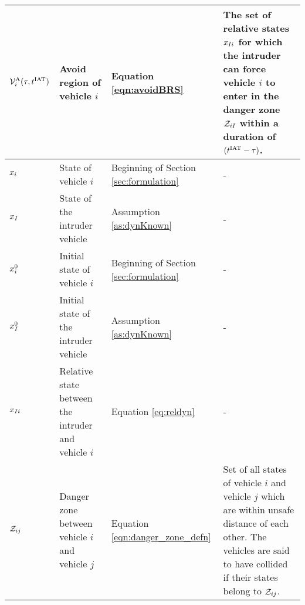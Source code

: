 \begin{table*}
{\begin{tabular}{ |>{\centering\arraybackslash}m{1.5cm}| m{5cm} | m{3cm} | m{\columnwidth} |}
    $\mathcal{V}^{\text{A}}_{i}(\tau, t^\text{IAT})$ & Avoid region of vehicle $i$ & Equation \eqref{eqn:avoidBRS} & The set of relative states $x_{I i}$ for which the intruder can force vehicle $i$ to enter in the danger zone $\mathcal{Z}_{i I}$ within a duration of $(t^\text{IAT}-\tau)$. \\ \hline

    $x_i$ & State of vehicle $i$ & Beginning of Section \ref{sec:formulation} & - \\ \hline
    $x_{I}$ & State of the intruder vehicle & Assumption \ref{as:dynKnown} & - \\ \hline
    $x_i^0$ & Initial state of vehicle $i$ & Beginning of Section \ref{sec:formulation} & - \\ \hline
    $x_{I}^0$ & Initial state of the intruder vehicle & Assumption \ref{as:dynKnown} & - \\ \hline
    $x_{I i}$ & Relative state between the intruder and vehicle $i$ & Equation \eqref{eq:reldyn} & - \\ \hline
    
   
    $\mathcal{Z}_{ij}$ & Danger zone between vehicle $i$ and vehicle $j$ & Equation \eqref{eqn:danger_zone_defn} & Set of all states of vehicle $i$ and vehicle $j$ which are within unsafe distance of each other. The vehicles are said to have collided if their states belong to $\mathcal{Z}_{ij}$. \\ \hline
    
    \end{tabular}
    }
    \label{table:notation}
\end{table*}

